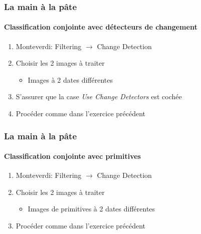 \documentclass[compress]{beamer}
\begin{document}
\begin{frame}
  \frametitle{La main à la pâte}
  \framesubtitle{Classification conjointe avec détecteurs de changement}
  \begin{enumerate}
  \item Monteverdi: Filtering $\rightarrow$ Change Detection
      \item Choisir les 2 images à traiter
    \begin{itemize}
    \item Images à 2 dates différentes
    \end{itemize}
  \item S'assurer que la case {\em Use Change Detectors} est cochée
  \item Procéder comme dans l'exercice précédent
  \end{enumerate}
\end{frame}

\begin{frame}
  \frametitle{La main à la pâte}
  \framesubtitle{Classification conjointe avec primitives}
  \begin{enumerate}
  \item Monteverdi: Filtering $\rightarrow$ Change Detection
      \item Choisir les 2 images à traiter
    \begin{itemize}
    \item Images de primitives à 2 dates différentes
    \end{itemize}
  \item Procéder comme dans l'exercice précédent
  \end{enumerate}
\end{frame}
\end{document}
